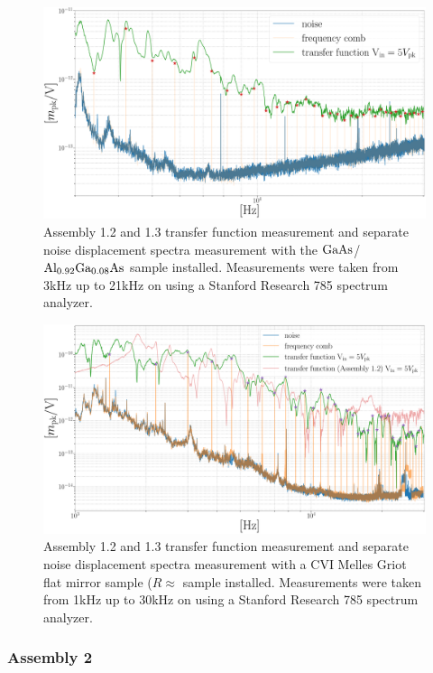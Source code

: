 \begin{figure}[H]
    \includegraphics[width=\textwidth]{figs/ALGAAS/results_figs/assembly1/1_2_algaas_tfwcmb.pdf}
    \caption{Assembly 1.2 and 1.3 transfer function measurement and separate noise displacement spectra measurement with the $\mathrm{GaAs}$/$\mathrm{Al_{0.92}Ga_{0.08}As}$ sample installed. Measurements were taken from 3kHz up to 21kHz on using a Stanford Research 785 spectrum analyzer.}
    \label{fig:assembly1_2_and_1_3_displacement_spectra_algaas}
\end{figure}

\begin{figure}[H]
    \includegraphics[width=\textwidth]{figs/ALGAAS/results_figs/assembly1/1_2_cvi_compare_tfwcmb.pdf}
    \caption{Assembly 1.2 and 1.3 transfer function measurement and separate noise displacement spectra measurement with a CVI Melles Griot flat mirror sample ($R \approx $ sample installed. Measurements were taken from 1kHz up to 30kHz on using a Stanford Research 785 spectrum analyzer.}
    \label{fig:assembly1_2_and_1_3_displacement_spectra_cvi}
\end{figure}

\subsubsection{Assembly 2}

